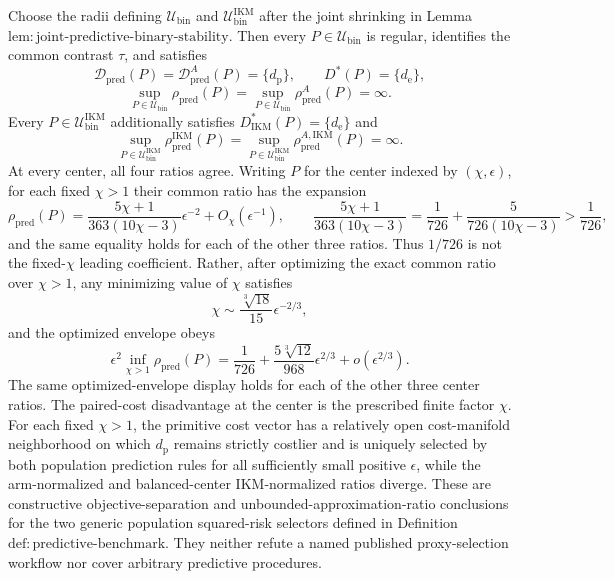 Choose the radii defining \(\mathcal U_{\mathrm{bin}}\) and \(\mathcal U_{\mathrm{bin}}^{\mathrm{IKM}}\) after the joint shrinking in Lemma~\(\mathrm{lem{:}joint\text{-}predictive\text{-}binary\text{-}stability}\). Then every \(P\in\mathcal U_{\mathrm{bin}}\) is regular, identifies the common contrast \(\tau\), and satisfies
\[
 \mathcal D_{\mathrm{pred}}(P)=\mathcal D_{\mathrm{pred}}^A(P)=\{d_{\mathrm p}\},
 \qquad D^*(P)=\{d_{\mathrm e}\},
\]
\[
 \sup_{P\in\mathcal U_{\mathrm{bin}}}\rho_{\mathrm{pred}}(P)
 =\sup_{P\in\mathcal U_{\mathrm{bin}}}\rho_{\mathrm{pred}}^A(P)=\infty. \tag{1}
\]
Every \(P\in\mathcal U_{\mathrm{bin}}^{\mathrm{IKM}}\) additionally satisfies \(D_{\mathrm{IKM}}^*(P)=\{d_{\mathrm e}\}\) and
\[
 \sup_{P\in\mathcal U_{\mathrm{bin}}^{\mathrm{IKM}}}
 \rho_{\mathrm{pred}}^{\mathrm{IKM}}(P)
 =\sup_{P\in\mathcal U_{\mathrm{bin}}^{\mathrm{IKM}}}
 \rho_{\mathrm{pred}}^{A,\mathrm{IKM}}(P)=\infty. \tag{2}
\]
At every center, all four ratios agree. Writing \(P\) for the center indexed by \((\chi,\epsilon)\), for each fixed \(\chi>1\) their common ratio has the expansion
\[
 \rho_{\mathrm{pred}}(P)
 =\frac{5\chi+1}{363(10\chi-3)}\epsilon^{-2}
 +O_\chi(\epsilon^{-1}),
 \qquad
 \frac{5\chi+1}{363(10\chi-3)}
 =\frac1{726}+\frac5{726(10\chi-3)} >\frac1{726}, \tag{3}
\]
and the same equality holds for each of the other three ratios. Thus \(1/726\) is not the fixed-\(\chi\) leading coefficient. Rather, after optimizing the exact common ratio over \(\chi>1\), any minimizing value of \(\chi\) satisfies
\[
 \chi\sim\frac{\sqrt[3]{18}}{15}\epsilon^{-2/3}, \tag{4}
\]
and the optimized envelope obeys
\[
 \epsilon^2\inf_{\chi>1}\rho_{\mathrm{pred}}(P)
 =\frac1{726}+\frac{5\sqrt[3]{12}}{968}\epsilon^{2/3}
 +o(\epsilon^{2/3}). \tag{5}
\]
The same optimized-envelope display holds for each of the other three center ratios. The paired-cost disadvantage at the center is the prescribed finite factor \(\chi\). For each fixed \(\chi>1\), the primitive cost vector has a relatively open cost-manifold neighborhood on which \(d_{\mathrm p}\) remains strictly costlier and is uniquely selected by both population prediction rules for all sufficiently small positive \(\epsilon\), while the arm-normalized and balanced-center IKM-normalized ratios diverge. These are constructive objective-separation and unbounded-approximation-ratio conclusions for the two generic population squared-risk selectors defined in Definition~\(\mathrm{def{:}predictive\text{-}benchmark}\). They neither refute a named published proxy-selection workflow nor cover arbitrary predictive procedures.